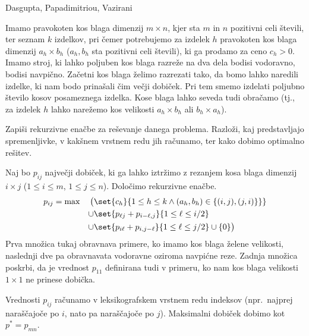 \begin{naloga}%
{Dasgupta, Papadimitriou, Vazirani}{\cite[Exercise~6.14]{dpv}}
\begin{vprasanje}
Imamo pravokoten kos blaga dimenzij $m \times n$,
kjer sta $m$ in $n$ pozitivni celi števili,
ter seznam $k$ izdelkov,
pri čemer potrebujemo za izdelek $h$
pravokoten kos blaga dimenzij $a_h \times b_h$
($a_h, b_h$ sta pozitivni celi števili),
ki ga prodamo za ceno $c_h > 0$.
Imamo stroj, ki lahko poljuben kos blaga razreže na dva dela
bodisi vodoravno, bodisi navpično.
Začetni kos blaga želimo razrezati tako,
da bomo lahko naredili izdelke,
ki nam bodo prinašali čim večji dobiček.
Pri tem smemo izdelati poljubno število kosov posameznega izdelka.
Kose blaga lahko seveda tudi obračamo
(tj., za izdelek $h$ lahko narežemo kos velikosti
$a_h \times b_h$ ali $b_h \times a_h$).

Zapiši rekurzivne enačbe za reševanje danega problema.
Razloži, kaj predstavljajo spremenljivke,
v kakšnem vrstnem redu jih računamo,
ter kako dobimo optimalno rešitev.
\end{vprasanje}

\begin{odgovor}
Naj bo $p_{ij}$ največji dobiček,
ki ga lahko iztržimo z rezanjem kosa blaga dimenzij $i \times j$
($1 \le i \le m$, $1 \le j \le n$).
Določimo rekurzivne enačbe.
\begin{alignat*}{3}
p_{ij} &= \max
& \big( &{} \set{c_h}{1 \le h \le k \land (a_h, b_h) \in \{(i, j), (j, i)\}\}} \\
&& \cup &{} \set{p_{\ell j} + p_{i-\ell, j}}{1 \le \ell \le i/2} \\
&& \cup &{} \set{p_{i \ell} + p_{i, j-\ell}}{1 \le \ell \le j/2} \cup \{0\}\big)
\end{alignat*}
Prva množica tukaj obravnava primere, ko imamo kos blaga želene velikosti,
naslednji dve pa obravnavata vodoravne oziroma navpićne reze.
Zadnja množica poskrbi, da je vrednost $p_{11}$ definirana tudi v primeru,
ko nam kos blaga velikosti $1 \times 1$ ne prinese dobička.

Vrednosti $p_{ij}$ računamo v leksikografskem vrstnem redu indeksov
(npr.~najprej naraščajoče po $i$, nato pa naraščajoče po $j$).
Maksimalni dobiček dobimo kot $p^* = p_{mn}$.
\end{odgovor}
\end{naloga}
